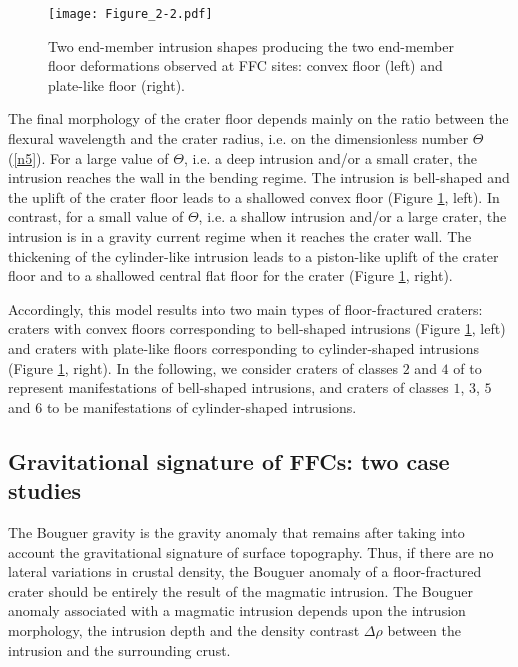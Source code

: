 \begin{figure}[h!]
  \graphicspath{ {/Users/thorey/Documents/These/Projet/FFC/Gravi_GRAIL/Article/Papier/SOUMISSION_2_EPSL/} }
  \begin{center}

    \texttt{[image: Figure\_2-2.pdf]}
    \caption{Two  end-member   intrusion  shapes  producing   the  two
      end-member  floor deformations  observed  at  FFC sites:  convex
      floor (left) and plate-like floor (right).}
    \label{Figure2-2}
  \end{center}
\end{figure}

The final morphology  of the crater floor depends mainly  on the ratio
between the  flexural wavelength and  the crater radius, i.e.   on the
dimensionless  number  $\Theta$  (\ref{n5}).   For a  large  value  of
$\Theta$, i.e. a  deep intrusion and/or a small  crater, the intrusion
reaches the wall  in the bending regime. The  intrusion is bell-shaped
and the uplift  of the crater floor leads to  a shallowed convex floor
(Figure \ref{Figure2-2},  left).  In  contrast, for  a small  value of
$\Theta$,  i.e.   a  shallow  intrusion and/or  a  large  crater,  the
intrusion is  in a gravity current  regime when it reaches  the crater
wall.   The  thickening of  the  cylinder-like  intrusion leads  to  a
piston-like uplift of the crater floor and to a shallowed central flat
floor for the crater (Figure \ref{Figure2-2}, right).

Accordingly, this model results into two main types of floor-fractured
craters:  craters  with  convex floors  corresponding  to  bell-shaped
intrusions (Figure \ref{Figure2-2}, left)  and craters with plate-like
floors   corresponding    to   cylinder-shaped    intrusions   (Figure
\ref{Figure2-2},  right).  In  the following,  we consider  craters of
classes   $2$  and   $4$   of   \citet{Schultz:1976kt}  to   represent
manifestations of bell-shaped intrusions,  and craters of classes $1$,
$3$, $5$ and $6$ to be manifestations of cylinder-shaped intrusions.
 
\subsection{Gravitational signature of FFCs: two case studies}
\label{sec:grav-sign-ffcs-1}

The Bouguer gravity  is the gravity anomaly that  remains after taking
into account the gravitational signature of surface topography.  Thus,
if there  are no  lateral variations in  crustal density,  the Bouguer
anomaly of a  floor-fractured crater should be entirely  the result of
the  magmatic  intrusion.   The  Bouguer  anomaly  associated  with  a
magmatic  intrusion   depends  upon  the  intrusion   morphology,  the
intrusion depth  and the  density contrast  $\Delta \rho$  between the
intrusion and the surrounding crust.

